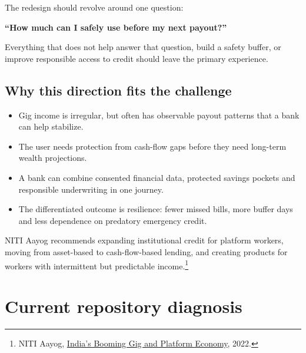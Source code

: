 \documentclass[10pt,a4paper]{article}
\begin{document}
The redesign should revolve around one question:

\begin{accentbox}
\centering
{\LARGE\bfseries ``How much can I safely use before my next payout?''}
\end{accentbox}

Everything that does not help answer that question, build a safety buffer, or improve responsible access to credit should leave the primary experience.

\subsection{Why this direction fits the challenge}

\begin{itemize}
  \item Gig income is irregular, but often has observable payout patterns that a bank can help stabilize.
  \item The user needs protection from cash-flow gaps before they need long-term wealth projections.
  \item A bank can combine consented financial data, protected savings pockets and responsible underwriting in one journey.
  \item The differentiated outcome is resilience: fewer missed bills, more buffer days and less dependence on predatory emergency credit.
\end{itemize}

NITI Aayog recommends expanding institutional credit for platform workers, moving from asset-based to cash-flow-based lending, and creating products for workers with intermittent but predictable income.\footnote{NITI Aayog, \href{https://www.niti.gov.in/sites/default/files/2023-02/25th_June_Final_Report_27062022.pdf}{India's Booming Gig and Platform Economy}, 2022.}

\section{Current repository diagnosis}
\end{document}
